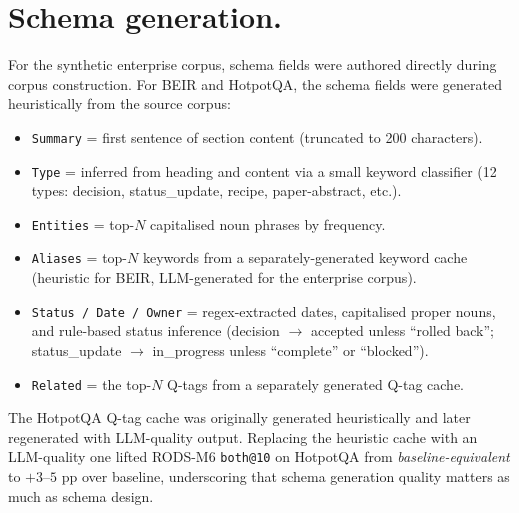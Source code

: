 \documentclass[11pt]{article}
\begin{document}
\section{Schema generation.}
For the synthetic enterprise corpus, schema fields were authored
directly during corpus construction. For BEIR and HotpotQA, the
schema fields were generated heuristically from the source corpus:

\begin{itemize}[noitemsep,topsep=0.2em]
  \item \texttt{Summary} = first sentence of section content (truncated
        to 200 characters).
  \item \texttt{Type} = inferred from heading and content via a small
        keyword classifier (12 types: decision, status\_update,
        recipe, paper-abstract, etc.).
  \item \texttt{Entities} = top-$N$ capitalised noun phrases by
        frequency.
  \item \texttt{Aliases} = top-$N$ keywords from a separately-generated
        keyword cache (heuristic for BEIR, LLM-generated for the
        enterprise corpus).
  \item \texttt{Status / Date / Owner} = regex-extracted dates,
        capitalised proper nouns, and rule-based status inference
        (decision $\to$ accepted unless ``rolled back''; status\_update
        $\to$ in\_progress unless ``complete'' or ``blocked'').
  \item \texttt{Related} = the top-$N$ Q-tags from a separately
        generated Q-tag cache.
\end{itemize}

The HotpotQA Q-tag cache was originally generated heuristically and
later regenerated with LLM-quality output. Replacing the heuristic
cache with an LLM-quality one lifted RODS-M6 \texttt{both@10} on
HotpotQA from \emph{baseline-equivalent} to $+3$--$5$ pp over baseline,
underscoring that schema generation quality matters as much as
schema design.


\end{document}
